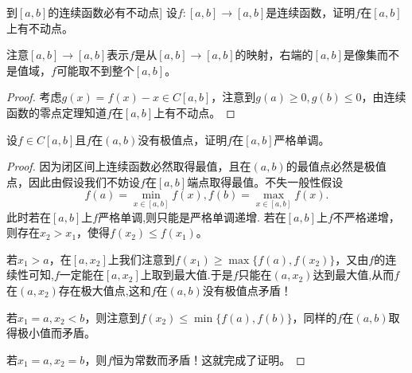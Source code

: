 \documentclass[../../main.tex]{subfiles}
\begin{document}
\begin{proposition}[\([a,b]\)到\([a,b]\)的连续函数必有不动点]\label{proposition:[a,b]到[a,b]的连续函数必有不动点}
设\(f:[a,b]\to[a,b]\)是连续函数，证明\(f\)在\([a,b]\)上有不动点。
\end{proposition}
\begin{note}
注意\([a,b]\to[a,b]\)表示\(f\)是从\([a,b]\to[a,b]\)的映射，右端的\([a,b]\)是像集而不是值域，\(f\)可能取不到整个\([a,b]\)。
\end{note}
\begin{proof}
考虑\(g(x)=f(x)-x\in C[a,b]\)，注意到\(g(a)\geqslant0,g(b)\leqslant0\)，由连续函数的零点定理知道\(f\)在\([a,b]\)上有不动点。
\end{proof}

\begin{proposition}[没有极值点则严格单调]\label{proposition:没有极值点则严格单调}
设\(f\in C[a,b]\)且\(f\)在\((a,b)\)没有极值点，证明\(f\)在\([a,b]\)严格单调。
\end{proposition}
\begin{proof}
因为闭区间上连续函数必然取得最值，且在\((a,b)\)的最值点必然是极值点，因此由假设我们不妨设\(f\)在\([a,b]\)端点取得最值。不失一般性假设
\[
f(a)=\min_{x\in[a,b]}f(x),f(b)=\max_{x\in[a,b]}f(x).
\]
此时若在\([a,b]\)上\(f\)严格单调,则只能是严格单调递增.
若在\([a,b]\)上\(f\)不严格递增，则存在\(x_2>x_1\)，使得\(f(x_2)\leqslant f(x_1)\)。

若\(x_1>a\)，在\([a,x_2]\)上我们注意到\(f(x_1)\geqslant\max\{f(a),f(x_2)\}\)，又由$f$的连续性可知,$f$一定能在$[a,x_2]$上取到最大值.于是\(f\)只能在\((a,x_2)\)达到最大值,从而$f$在\((a,x_2)\)存在极大值点,这和\(f\)在\((a,b)\)没有极值点矛盾！

若\(x_1 = a,x_2 < b\)，则注意到\(f(x_2)\leqslant\min\{f(a),f(b)\}\)，同样的\(f\)在\((a,b)\)取得极小值而矛盾。

若\(x_1 = a,x_2 = b\)，则\(f\)恒为常数而矛盾！这就完成了证明。
\end{proof}
\end{document}
